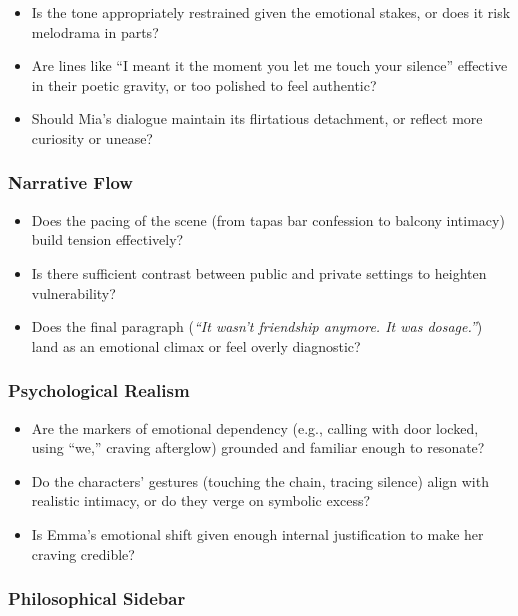 \begin{itemize}
  \item Is the tone appropriately restrained given the emotional stakes, or does it risk melodrama in parts?
  \item Are lines like ``I meant it the moment you let me touch your silence'' effective in their poetic gravity, or too polished to feel authentic?
  \item Should Mia’s dialogue maintain its flirtatious detachment, or reflect more curiosity or unease?
\end{itemize}

\subsubsection*{Narrative Flow}

\begin{itemize}
  \item Does the pacing of the scene (from tapas bar confession to balcony intimacy) build tension effectively?
  \item Is there sufficient contrast between public and private settings to heighten vulnerability?
  \item Does the final paragraph (\textit{“It wasn’t friendship anymore. It was dosage.”}) land as an emotional climax or feel overly diagnostic?
\end{itemize}

\subsubsection*{Psychological Realism}

\begin{itemize}
  \item Are the markers of emotional dependency (e.g., calling with door locked, using “we,” craving afterglow) grounded and familiar enough to resonate?
  \item Do the characters’ gestures (touching the chain, tracing silence) align with realistic intimacy, or do they verge on symbolic excess?
  \item Is Emma’s emotional shift given enough internal justification to make her craving credible?
\end{itemize}

\subsubsection*{Philosophical Sidebar}

